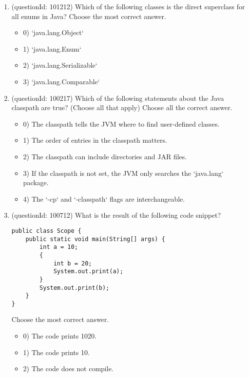 \documentclass[12pt]{article}
\begin{document}
\begin{enumerate}[label=(\arabic*)]
\begin{itemize}
\end{itemize}
\item (questionId: 101212) Which of the following classes is the direct superclass for all enums in Java?
Choose the most correct answer. 
\begin{itemize}
\item 0) `java.lang.Object`

\item 1) `java.lang.Enum`

\item 2) `java.lang.Serializable`

\item 3) `java.lang.Comparable`

\end{itemize}
\item (questionId: 100217) Which of the following statements about the Java classpath are true? (Choose all that apply)
Choose all the correct answer.\begin{itemize}
\item 0) The classpath tells the JVM where to find user-defined classes.

\item 1) The order of entries in the classpath matters.

\item 2) The classpath can include directories and JAR files.

\item 3) If the classpath is not set, the JVM only searches the `java.lang` package.

\item 4) The `-cp` and `-classpath` flags are interchangeable.

\end{itemize}
\item (questionId: 100712) What is the result of the following code snippet?\n\begin{verbatim}
public class Scope {
    public static void main(String[] args) {
        int a = 10;
        {
            int b = 20;
            System.out.print(a);
        }
        System.out.print(b);
    }
}
\end{verbatim}
Choose the most correct answer. 
\begin{itemize}
\item 0) The code prints 1020.

\item 1) The code prints 10.

\item 2) The code does not compile.


\end{itemize}
\end{enumerate}
\end{document}
